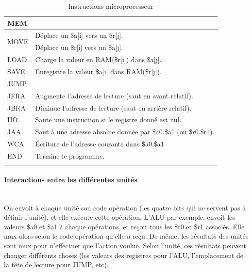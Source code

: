\documentclass{article}
\begin{document}
\begin{savenotes}
\begin{longtable}{|l|l|}
  \hline\hline
  \multicolumn{2}{|l|}{MEM} \\
  \hline
  \multirow{2}{*}{MOVE} & Déplace un \$a[i] vers un \$r[j]. \\
                        & Déplace un \$r[i] vers un \$a[j]. \\
  LOAD                  & Charge la valeur en RAM(\$r[i]) dans \$a[j]. \\
  SAVE                  & Enregistre la valeur \$a[i] dans RAM(\$r[j]). \\

  \hline\hline
  \multicolumn{2}{|l|}{JUMP} \\
  \hline
  JFRA & Augmente l'adresse de lecture (saut en avant relatif). \\
  JBRA & Diminue l'adresse de lecture (saut en arrière relatif). \\
  IIO  & Saute une instruction si le registre donné est nul. \\
  JAA  & Saut à une adresse absolue donnée par \$a0.\$a1 (ou \$r0.\$r1). \\
  WCA  & \'Ecriture de l'adresse courante dans \$a0.\$a1. \\
  END  & Termine le programme. \\
  \hline

\caption{Instructions microprocesseur}
\end{longtable}
\end{savenotes}

\paragraph{Interactions entre les différentes unités}~\\
On envoit à chaque unité son code opération (les quatre bits qui ne servent pas
à définir l'unité), et elle exécute cette opération. L'ALU par exemple, envoit
les valeurs \$a0 et \$a1 à chaque opérations, et reçoit tous les \$r0 et \$r1
associés. Elle mux alors selon le code opération qu'elle a reçu. De même, les
résultats des unités sont mux pour n'effectuer que l'action voulue. Selon
l'unité, ces résultats peuvent changer différents choses (les valeurs des
registres pour l'ALU, l'emplacement de la tête de lecture pour JUMP, etc).\\
\end{document}
